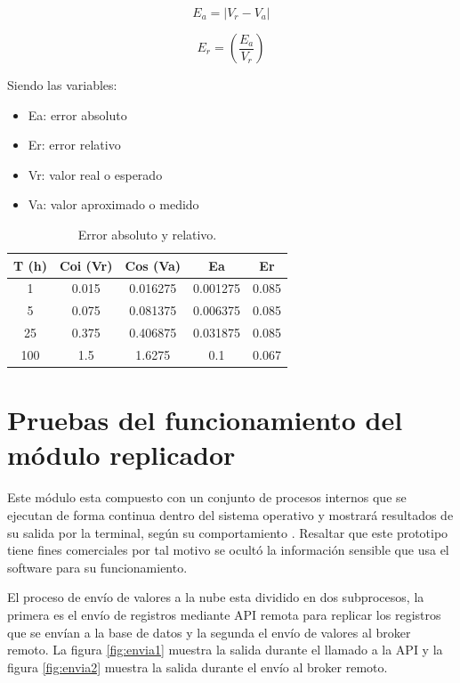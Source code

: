 \begin{equation}
	\label{eq:ea}
	E_a = \left| V_r - V_a \right|
\end{equation}

\begin{equation}
	\label{eq:er}
	E_r = \left( \frac{E_a}{V_r} \right)
\end{equation}

\vspace{0.1cm}
Siendo las variables:
\begin{itemize}
\item Ea: error absoluto 
\item Er: error relativo
\item Vr: valor real o esperado
\item Va: valor aproximado o medido
\end{itemize}

\vspace{0.5cm}
\begin{table}[h]
	\centering
	\caption[Error absoluto y relativo]{Error absoluto y relativo.}
	\begin{tabular}{c c c c c}    
		\toprule
		\textbf{T (h)} & \textbf{Coi (Vr)} &\textbf{Cos (Va)} &\textbf{Ea} &\textbf{Er}\\
		\midrule
		1 & 0.015 & 0.016275 & 0.001275 & 0.085 \\		
		5 & 0.075 & 0.081375 & 0.006375 & 0.085 \\
		25 & 0.375 & 0.406875 & 0.031875 & 0.085\\		
		100 & 1.5 & 1.6275 & 0.1 & 0.067\\		
		
		\bottomrule
		\hline
	\end{tabular}
	\label{tab:tablaerror}
\end{table}

\section{Pruebas del funcionamiento del módulo replicador}

Este módulo esta compuesto con un conjunto de procesos internos que se ejecutan de forma continua dentro del sistema operativo y mostrará resultados de su salida por la terminal, según su comportamiento . Resaltar que este prototipo tiene fines comerciales por tal motivo se ocultó la información sensible que usa el software para su funcionamiento.

El proceso de envío de valores a la nube esta dividido en dos subprocesos, la primera es el envío de registros mediante API remota para replicar los registros que se envían a la base de datos y la segunda el envío de valores al broker remoto. La figura \ref{fig:envia1} muestra la salida durante el llamado a la API y la figura \ref{fig:envia2} muestra la salida durante el envío al broker remoto.

